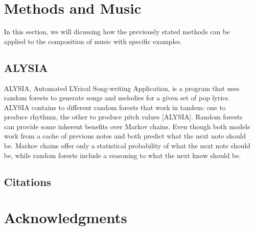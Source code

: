 \documentclass{sig-alternate}
\begin{document}
\section{Methods and Music}
	In this section, we will dicussing how the previously stated methods can be applied to the composition of music with specific examples. 

\subsection{ALYSIA}
\label{sec:ALYSIA}
	ALYSIA, Automated LYrical Song-writing Application, is a program that uses random forests to generate songs and melodies for a given set of pop lyrics. ALYSIA contains to different random forests that work in tandem: one to produce rhythmn, the other to produce pitch values [ALYSIA]. Random forests can provide some inherent benefits over Markov chains. Even though both models work from a cache of previous notes and both predict what the next note should be. Markov chains offer only a statistical probability of what the next note should be, while random forests include a reasoning to what the next know should be. 

\label{sec:methodsandmusic}
\subsection{Citations}
\label{sec:citations}

\subsection{}
\label{sec:theoremLikeConstructs}


\subsection*{}
\label{sec:caveatForExperts}



\section*{Acknowledgments}
\label{sec:acknowledgments}



  
\end{document}
